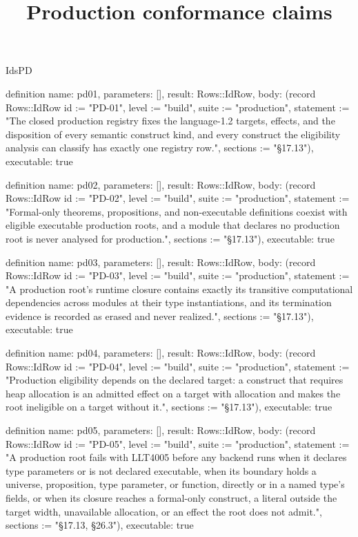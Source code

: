 \begin{lexlean}{IdsPD}
\title{Production conformance claims}
\begin{semanticmodule}
definition{
  name: pd01,
  parameters: [],
  result: Rows::IdRow,
  body: (record Rows::IdRow {id := "PD-01", level := "build", suite := "production", statement := "The closed production registry fixes the language-1.2 targets, effects, and the disposition of every semantic construct kind, and every construct the eligibility analysis can classify has exactly one registry row.", sections := "§17.13"}),
  executable: true
}

definition{
  name: pd02,
  parameters: [],
  result: Rows::IdRow,
  body: (record Rows::IdRow {id := "PD-02", level := "build", suite := "production", statement := "Formal-only theorems, propositions, and non-executable definitions coexist with eligible executable production roots, and a module that declares no production root is never analysed for production.", sections := "§17.13"}),
  executable: true
}

definition{
  name: pd03,
  parameters: [],
  result: Rows::IdRow,
  body: (record Rows::IdRow {id := "PD-03", level := "build", suite := "production", statement := "A production root's runtime closure contains exactly its transitive computational dependencies across modules at their type instantiations, and its termination evidence is recorded as erased and never realized.", sections := "§17.13"}),
  executable: true
}

definition{
  name: pd04,
  parameters: [],
  result: Rows::IdRow,
  body: (record Rows::IdRow {id := "PD-04", level := "build", suite := "production", statement := "Production eligibility depends on the declared target: a construct that requires heap allocation is an admitted effect on a target with allocation and makes the root ineligible on a target without it.", sections := "§17.13"}),
  executable: true
}

definition{
  name: pd05,
  parameters: [],
  result: Rows::IdRow,
  body: (record Rows::IdRow {id := "PD-05", level := "build", suite := "production", statement := "A production root fails with LLT4005 before any backend runs when it declares type parameters or is not declared executable, when its boundary holds a universe, proposition, type parameter, or function, directly or in a named type's fields, or when its closure reaches a formal-only construct, a literal outside the target width, unavailable allocation, or an effect the root does not admit.", sections := "§17.13, §26.3"}),
  executable: true
}


\end{semanticmodule}
\end{lexlean}
